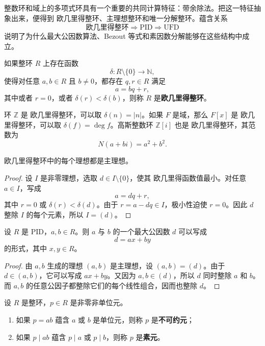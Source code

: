 整数环和域上的多项式环具有一个重要的共同计算特征：带余除法。把这一特征抽象出来，便得到 欧几里得整环、主理想整环和唯一分解整环。蕴含关系
\[
    \text{欧几里得整环}\Longrightarrow\text{PID}\Longrightarrow\text{UFD}
\]
说明了为什么最大公因数算法、Bezout 等式和素因数分解能够在这些结构中成立。

\begin{definition}[欧几里得整环]
如果整环 $R$ 上存在函数
\[
    \delta:R\setminus\{0\}\to\mathbb{N},
\]
使得对任意 $a,b\in R$ 且 $b\neq0$，都存在 $q,r\in R$ 满足
\[
    a=bq+r,
\]
其中或者 $r=0$，或者 $\delta(r)<\delta(b)$，则称 $R$ 是\textbf{欧几里得整环}。
\end{definition}

\begin{example}
环 $\mathbb{Z}$ 是 欧几里得整环，可以取 $\delta(n)=|n|$。如果 $F$ 是域，那么 $F[x]$ 是 欧几里得整环，可以取 $\delta(f)=\deg f$。高斯整数环 $\mathbb{Z}[i]$ 也是 欧几里得整环，其范数为
\[
    N(a+bi)=a^2+b^2.
\]
\end{example}

\begin{theorem}
欧几里得整环中的每个理想都是主理想。
\end{theorem}

\begin{proof}
设 $I$ 是非零理想，选取 $d\in I\setminus\{0\}$，使其 欧几里得函数值最小。对任意 $a\in I$，写成
\[
    a=dq+r,
\]
其中 $r=0$ 或 $\delta(r)<\delta(d)$。由于 $r=a-dq\in I$，极小性迫使 $r=0$。因此 $d$ 整除 $I$ 的每个元素，所以 $I=(d)$。
\end{proof}

\begin{theorem}
设 $R$ 是 PID，$a,b\in R$。则 $a$ 与 $b$ 的一个最大公因数 $d$ 可以写成
\[
    d=ax+by
\]
的形式，其中 $x,y\in R$。
\end{theorem}

\begin{proof}
由 $a,b$ 生成的理想 $(a,b)$ 是主理想，设 $(a,b)=(d)$。由于 $d\in(a,b)$，它可以写成 $ax+by$。又因为 $a,b\in(d)$，所以 $d$ 同时整除 $a$ 和 $b$。而 $a,b$ 的任意公因子都整除它们的每个线性组合，因而也整除 $d$。
\end{proof}

\begin{definition}[不可约元与素元]
设 $R$ 是整环，$p\in R$ 是非零非单位元。
\begin{enumerate}
    \item 如果 $p=ab$ 蕴含 $a$ 或 $b$ 是单位元，则称 $p$ 是\textbf{不可约元}；
    \item 如果 $p\mid ab$ 蕴含 $p\mid a$ 或 $p\mid b$，则称 $p$ 是\textbf{素元}。
\end{enumerate}
\end{definition}

